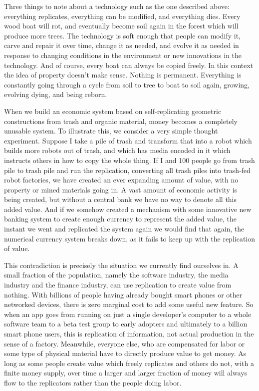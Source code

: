 Three things to note about a technology such as the one described above:
everything replicates, everything can be modified, and everything dies.
Every wood boat will rot, and eventually become soil again in the forest
which will produce more trees. The technology is soft enough that people
can modify it, carve and repair it over time, change it as needed, and
evolve it as needed in response to changing conditions in the
environment or new innovations in the technology. And of course, every
boat can always be copied freely. In this context the idea of property
doesn't make sense. Nothing is permanent. Everything is constantly going
through a cycle from soil to tree to boat to soil again, growing,
evolving dying, and being reborn.


When we build an economic system based on self-replicating geometric
constructions from trash and organic material, money becomes a
completely unusable system. To illustrate this, we consider a very
simple thought experiment. Suppose I take a pile of trash and transform
that into a robot which builds more robots out of trash, and which has
media encoded in it which instructs others in how to copy the whole
thing. If I and 100 people go from trash pile to trash pile and run the
replication, converting all trash piles into trash-fed robot factories,
we have created an ever expanding amount of value, with no property or
mined materials going in. A vast amount of economic activity is being
created, but without a central bank we have no way to denote all this
added value. And if we somehow created a mechanism with some innovative
new banking system to create enough currency to represent the added
value, the instant we went and replicated the system again we would find
that again, the numerical currency system breaks down, as it fails to
keep up with the replication of value.

This contradiction is precisely the situation we currently find
ourselves in. A small fraction of the population, namely the software
industry, the media industry and the finance industry, can use
replication to create value from nothing. With billions of people having
already bought smart phones or other networked devices, there is zero
marginal cost to add some useful new feature. So when an app goes from
running on just a single developer's computer to a whole software team
to a beta test group to early adopters and ultimately to a billion smart
phone users, this is replication of information, not actual production
in the sense of a factory. Meanwhile, everyone else, who are compensated
for labor or some type of physical material have to directly produce
value to get money. As long as some people create value which freely
replicates and others do not, with a finite money supply, over time a
larger and larger fraction of money will always flow to the replicators
rather than the people doing labor.

